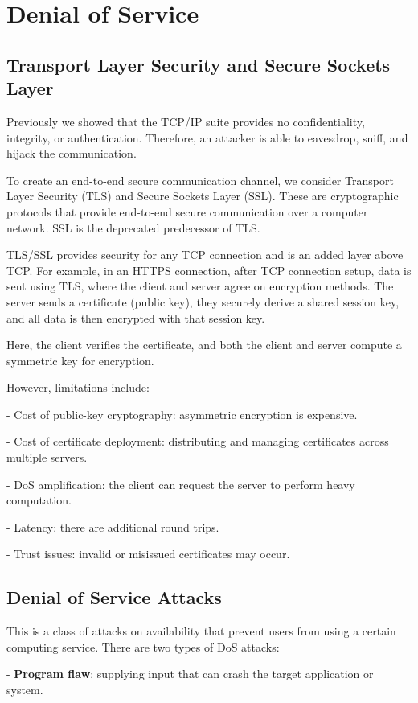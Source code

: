 \section{Denial of Service}

\subsection{Transport Layer Security and Secure Sockets Layer}
Previously we showed that the TCP/IP suite provides no confidentiality, integrity, or authentication. Therefore, an attacker is able to eavesdrop, sniff, and hijack the communication. 

To create an end-to-end secure communication channel, we consider Transport Layer Security (TLS) and Secure Sockets Layer (SSL). These are cryptographic protocols that provide end-to-end secure communication over a computer network. SSL is the deprecated predecessor of TLS. 

TLS/SSL provides security for any TCP connection and is an added layer above TCP. For example, in an HTTPS connection, after TCP connection setup, data is sent using TLS, where the client and server agree on encryption methods. The server sends a certificate (public key), they securely derive a shared session key, and all data is then encrypted with that session key. 

Here, the client verifies the certificate, and both the client and server compute a symmetric key for encryption.  

However, limitations include: 

- Cost of public-key cryptography: asymmetric encryption is expensive.  

- Cost of certificate deployment: distributing and managing certificates across multiple servers.  

- DoS amplification: the client can request the server to perform heavy computation.  

- Latency: there are additional round trips.  

- Trust issues: invalid or misissued certificates may occur.  

\subsection{Denial of Service Attacks}
This is a class of attacks on availability that prevent users from using a certain computing service. There are two types of DoS attacks:  

- \textbf{Program flaw}: supplying input that can crash the target application or system.  

